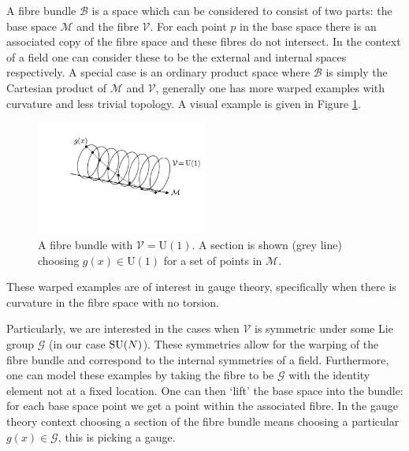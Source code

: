 A fibre bundle $\mathcal{B}$ is a space which can be considered to consist of two parts: the base space $\mathcal{M}$ and the fibre $\mathcal{V}$. For each point $p$ in the base space there is an associated copy of the fibre space and these fibres do not intersect. 
In the context of a field one can consider these to be the external and internal spaces respectively. A special case is an ordinary product space where $\mathcal{B}$ is simply the Cartesian product of $\mathcal{M}$ and $\mathcal{V}$, generally one has more warped examples with curvature and less trivial topology. A visual example is given in Figure \ref{fig:theory:fibre_bundle}.
\begin{figure}[h!]
    \includegraphics[width=0.5\textwidth]{figures/theory/fibre_bundle.pdf}
    \caption{A fibre bundle with $\mathcal{V} = \mathrm{U}(1)$. A section is shown (grey line) choosing $g(x)\in\mathrm{U}(1)$ for a set of points in $\mathcal{M}$.}
    \label{fig:theory:fibre_bundle}
\end{figure}
These warped examples are of interest in gauge theory, specifically when there is curvature in the fibre space with no torsion.

Particularly, we are interested in the cases when $\mathcal{V}$ is symmetric under some Lie group $\mathcal{G}$ (in our case ${\mathrm{SU}(N)}$). 
These symmetries allow for the warping of the fibre bundle and correspond to the internal symmetries of a field. 
Furthermore, one can model these examples by taking the fibre to be $\mathcal{G}$ with the identity element not at a fixed location. 
One can then `lift' the base space into the bundle: for each base space point we get a point within the associated fibre. In the gauge theory context choosing a section of the fibre bundle means choosing a particular $g(x)\in\mathcal{G}$, this is picking a gauge. 

